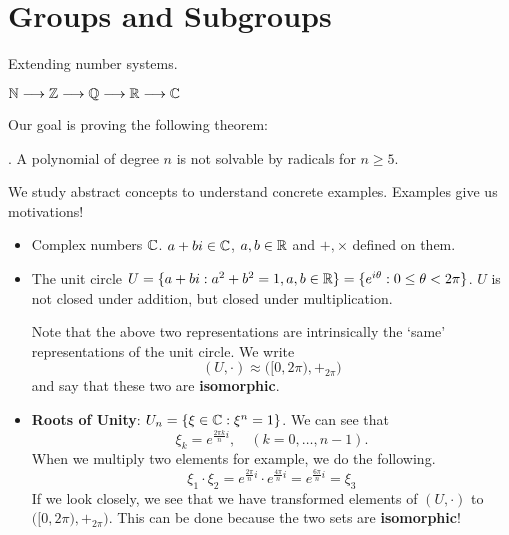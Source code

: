 \chapter{Groups and Subgroups}


Extending number systems.
\begin{center}
    \(\mathbb{N} \longrightarrow \mathbb{Z} \longrightarrow \mathbb{Q} \longrightarrow \mathbb{R} \longrightarrow \mathbb{C}\)
\end{center}

Our goal is proving the following theorem:

\thm. A polynomial of degree \(n\) is not solvable by radicals for \(n \geq 5\).

We study abstract concepts to understand concrete examples. Examples give us motivations!

\begin{itemize}
    \item Complex numbers \(\mathbb{C}\). \(a + bi \in \mathbb{C}\), \(a, b \in \mathbb{R}\) and \(+, \times\) defined on them.
    \item The unit circle \(U = \{a + bi : a^2 + b^2 = 1, a, b \in \mathbb{R}\} = \{e^{i\theta} : 0 \leq \theta < 2\pi\}\). \(U\) is not closed under addition, but closed under multiplication.

          Note that the above two representations are intrinsically the `same' representations of the unit circle. We write
          \[
              (U, \cdot) \approx \bigl([0, 2\pi), +_{2\pi}\bigr)
          \]
          and say that these two are \textbf{isomorphic}.
    \item \textbf{Roots of Unity}: \(U_n = \{\xi \in \mathbb{C} : \xi^n = 1\}\). We can see that
          \[
              \xi_k = e^{\frac{2\pi k}{n}i}, \quad (k = 0, \dots, n - 1).
          \]
          When we multiply two elements for example, we do the following.
          \[
              \xi_1 \cdot \xi_2 = e^{\frac{2\pi}{n}i} \cdot e^{\frac{4\pi}{n}i} = e^{\frac{6\pi}{n}i} = \xi_3
          \]
          If we look closely, we see that we have transformed elements of \((U, \cdot)\) to \(\bigl([0, 2\pi), +_{2\pi}\bigr)\). This can be done because the two sets are \textbf{isomorphic}!
\end{itemize}

\pagebreak
